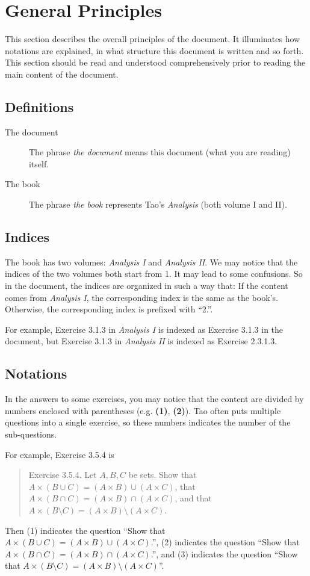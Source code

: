 
\section{General Principles}
This section describes the overall principles of the document. It illuminates how notations are explained, 
in what structure this document is written and so forth. This section should be read and understood 
comprehensively prior to reading the main content of the document.

\subsection{Definitions}
\begin{description}
\item[The document] The phrase \emph{the document} means this document (what you are reading) itself.
\item[The book] The phrase \emph{the book} represents Tao's \emph{Analysis} (both volume I and II).
\end{description}

\subsection{Indices}
The book has two volumes: 
\emph{Analysis I} and \emph{Analysis II}. We may notice that the indices of the two volumes both start 
from 1. It may lead to some confusions. So in the document, the indices are organized in such a way that:
If the content comes from \emph{Analysis I}, the corresponding index is the same as the book's. 
Otherwise, the corresponding index is prefixed with ``2.''.

For example, Exercise 3.1.3 in \emph{Analysis I} is indexed as Exercise 3.1.3 in the document, but 
Exercise 3.1.3 in \emph{Analysis II} is indexed as Exercise 2.3.1.3.

\subsection{Notations}
In the answers to some exercises, you may notice that the content are divided by numbers enclosed with 
parentheses (e.g. \textbf{(1)}, \textbf{(2)}). Tao often puts multiple questions into a single exercise, 
so these numbers indicates the number of the sub-questions.

For example, Exercise 3.5.4 is 
\begin{quotation}
Exercise 3.5.4. Let $A,B,C$ be sets. Show that $A\times(B\cup C) = (A\times B)\cup(A\times C)$,
that $A\times(B\cap C) = (A\times B)\cap(A\times C)$, and that 
$ A\times(B\setminus C) = (A\times B)\setminus(A\times C)$.
\end{quotation}
Then (1) indicates the question ``Show that $A\times(B\cup C) = (A\times B)\cup(A\times C)$.'', 
(2) indicates the question ``Show that $A\times(B\cap C) = (A\times B)\cap(A\times C)$.'', and 
(3) indicates the question ``Show that $A\times(B\setminus C) = (A\times B)\setminus(A\times C)$''.

